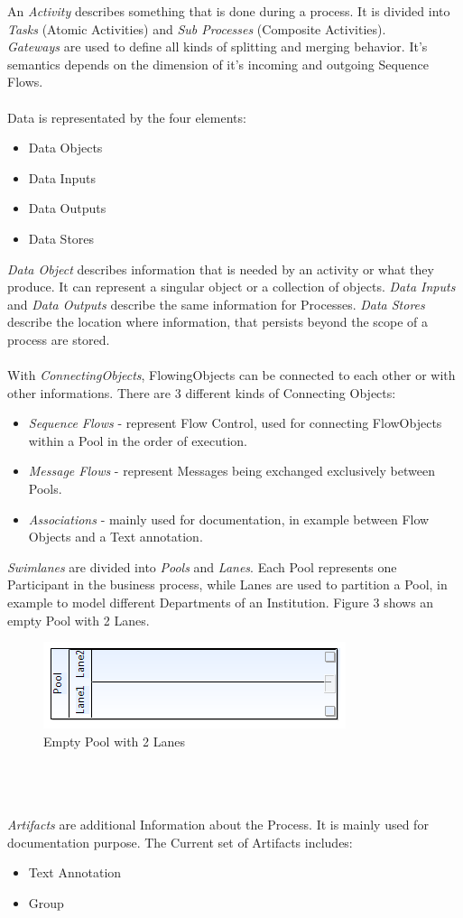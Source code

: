 An \textit{Activity} describes something that is done during a process. It is divided into \textit{Tasks} (Atomic Activities) and \textit{Sub Processes} (Composite Activities).\\
\textit{Gateways} are used to define all kinds of splitting and merging behavior. It's semantics depends on the dimension of it's incoming and outgoing Sequence Flows.
\\\\
Data is representated by the four elements:
\begin{itemize}
	\item Data Objects
	\item Data Inputs
	\item Data Outputs
	\item Data Stores
\end{itemize}
\textit{Data Object} describes information that is needed by an activity or what they produce. It can represent a singular object or a collection of objects. \textit{Data Inputs} and \textit{Data Outputs} describe the same information for Processes. \textit{Data Stores} describe the location where information, that persists beyond the scope of a process are stored.\\\\
With \textit{ConnectingObjects}, FlowingObjects can be connected to each other or with other informations. There are 3 different kinds of Connecting Objects:
\begin{itemize}
	\item \textit{Sequence Flows} - represent Flow Control, used for connecting FlowObjects within a Pool in the order of execution.
	\item \textit{Message Flows} - represent Messages being exchanged exclusively between Pools.
	\item \textit{Associations} -  mainly used for documentation, in example between Flow Objects and a Text annotation.
\end{itemize}
\textit{Swimlanes} are divided into \textit{Pools} and \textit{Lanes}. Each Pool represents one Participant in the business process, while Lanes are used to partition a Pool, in example to model different Departments of an Institution. Figure 3 shows an empty Pool with 2 Lanes.
\begin{figure}[h]
	\centering
		\includegraphics{images/swimlane.png}
	\caption{Empty Pool with 2 Lanes}
	\label{fig:swimlane}
\end{figure}\\\\\\
\textit{Artifacts} are additional Information about the Process. It is mainly used for documentation purpose. The Current set of Artifacts includes:
\begin{itemize}
	\item Text Annotation
	\item Group
\end{itemize}



